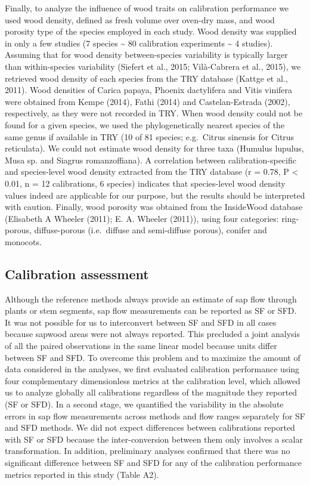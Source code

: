 \documentclass[11pt,twoside]{reedthesis}
\begin{document}
Finally, to analyze the influence of wood traits on calibration
performance we used wood density, defined as fresh volume over oven-dry
mass, and wood porosity type of the species employed in each study. Wood
density was supplied in only a few studies (7 species \textasciitilde{}
80 calibration experiments \textasciitilde{} 4 studies). Assuming that
for wood density between-species variability is typically larger than
within-species variability (Siefert et al., 2015; Vilà-Cabrera et al.,
2015), we retrieved wood density of each species from the TRY database
(Kattge et al., 2011). Wood densities of Carica papaya, Phoenix
dactylifera and Vitis vinifera were obtained from Kempe (2014), Fathi
(2014) and Castelan-Estrada (2002), respectively, as they were not
recorded in TRY. When wood density could not be found for a given
species, we used the phylogenetically nearest species of the same genus
if available in TRY (10 of 81 species; e.g.~Citrus sinensis for Citrus
reticulata). We could not estimate wood density for three taxa (Humulus
lupulus, Musa sp. and Siagrus romanzoffiana). A correlation between
calibration-specific and species-level wood density extracted from the
TRY database (r = 0.78, P \textless{} 0.01, n = 12 calibrations, 6
species) indicates that species-level wood density values indeed are
applicable for our purpose, but the results should be interpreted with
caution. Finally, wood porosity was obtained from the InsideWood
database (Elisabeth A Wheeler (2011); E. A. Wheeler (2011)), using four
categories: ring-porous, diffuse-porous (i.e.~diffuse and semi-diffuse
porous), conifer and monocots.\par

\subsection{Calibration assessment}\label{calibration-assessment}

Although the reference methods always provide an estimate of sap flow
through plants or stem segments, sap flow measurements can be reported
as SF or SFD. It was not possible for us to interconvert between SF and
SFD in all cases because sapwood areas were not always reported. This
precluded a joint analysis of all the paired observations in the same
linear model because units differ between SF and SFD. To overcome this
problem and to maximize the amount of data considered in the analyses,
we first evaluated calibration performance using four complementary
dimensionless metrics at the calibration level, which allowed us to
analyze globally all calibrations regardless of the magnitude they
reported (SF or SFD). In a second stage, we quantified the variability
in the absolute errors in sap flow measurements across methods and flow
ranges separately for SF and SFD methods. We did not expect differences
between calibrations reported with SF or SFD because the
inter-conversion between them only involves a scalar transformation. In
addition, preliminary analyses confirmed that there was no significant
difference between SF and SFD for any of the calibration performance
metrics reported in this study (Table A2).\par
\end{document}
